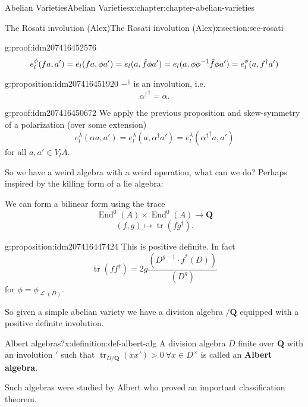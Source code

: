 \documentclass[oneside,10pt,]{book}
\newcommand{\terminology}[1]{\textbf{#1}}
\newcommand{\qedhere}{\relax}
\numberwithin{equation}{section}
\newcommand{\sheaf}[1]{\operatorname{\mathcal{#1}}}
\newcommand{\inv}{^{-1}}
\newcommand{\QQ}{\mathbf{Q}}
\DeclareMathOperator{\End}{End}
\DeclareMathOperator{\tr}{tr}
\begin{document}
\begin{chapterptx}{Abelian Varieties}{}{Abelian Varieties}{}{}{x:chapter:chapter-abelian-varieties}
\begin{sectionptx}{The Rosati involution (Alex)}{}{The Rosati involution (Alex)}{}{}{x:section:sec-rosati}
\begin{proofptx}{}{g:proof:idm207416452576}
%
\begin{equation*}
e_l^\phi(f a ,a')  = e_l(fa, \phi a')= e_l(a, \hat f \phi a') = e_l(a, \phi\phi\inv \hat f \phi a') =  e_l^\phi(a, f^\dagger a')\qedhere
\end{equation*}
%
\end{proofptx}
\begin{proposition}{}{}{g:proposition:idm207416451920}%
\(-^\dagger\) is an involution, i.e.%
\begin{equation*}
{\alpha^\dagger}^{\dagger} = \alpha\text{.}
\end{equation*}
%
\end{proposition}
\begin{proofptx}{}{g:proof:idm207416450672}
We apply the previous proposition and skew-symmetry of a polarization (over some extension)%
\begin{equation*}
e_l^\lambda(\alpha a,a') = e_l^\lambda(a, \alpha^\dagger a') = e_l^\lambda({\alpha^\dagger}^{\dagger} a, a')
\end{equation*}
for all \(a,a'\in V_l A\).%
\end{proofptx}
So we have a weird algebra with a weird operation, what can we do? Perhaps inspired by the killing form of a lie algebra:%
\par
We can form a bilinear form using the trace%
\begin{equation*}
\End^0(A) \times \End^0(A) \to \QQ
\end{equation*}
%
\begin{equation*}
(f,g) \mapsto \tr(fg^\dagger)\text{.}
\end{equation*}
%
\begin{proposition}{}{}{g:proposition:idm207416447424}%
This is positive definite. In fact%
\begin{equation*}
\tr(ff^\dagger) = 2g\frac{(D^{g-1}\cdot f^*(D))}{(D^g)}
\end{equation*}
for \(\phi = \phi_{\sheaf L(D)}\).%
\end{proposition}
So given a simple abelian variety we have a division algebra  \(/ \QQ\) equipped with  a positive definite involution.%
\begin{definition}{Albert algebras?}{x:definition:def-albert-alg}%
A division algebra \(D\) finite over \(\QQ\) with an involution \('\) such that \(\tr_{D/\QQ}(xx') > 0\ \forall x\in D^\times\) is called an \terminology{Albert algebra}.%
\end{definition}
Such algebras were studied by Albert who proved an important classification theorem.%

\end{sectionptx}
\end{chapterptx}
\end{document}
